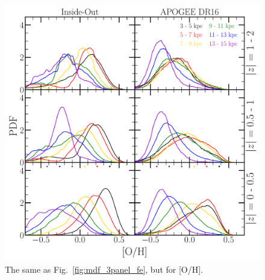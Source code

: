 \documentclass[draft2.tex]{subfiles}
\begin{document}
\begin{figure} 
\centering 
\includegraphics[scale = 0.34]{mdf_3panel_o.pdf} 
\caption{The same as Fig.~\ref{fig:mdf_3panel_fe}, but for [O/H]. } 
\label{fig:mdf_3panel_o} 
\end{figure} 
\end{document}
